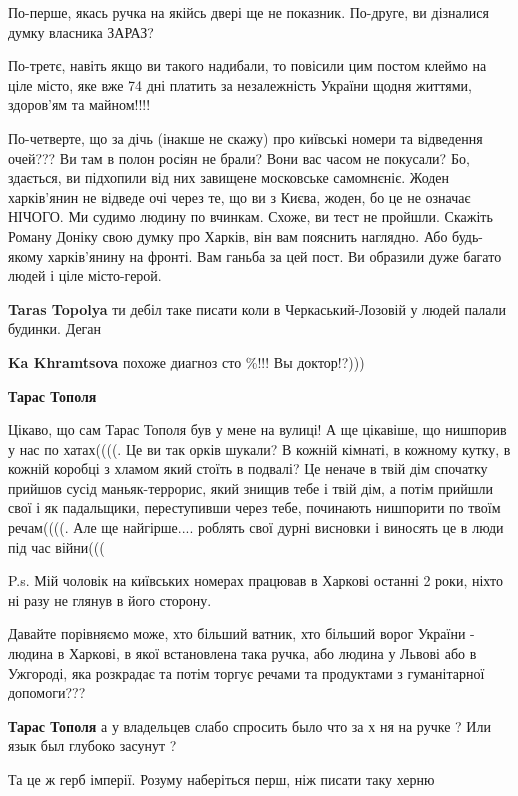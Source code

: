 \begin{itemize}
\begin{itemize}
По-перше, якась ручка на якійсь двері ще не показник. По-друге, ви дізналися
думку власника ЗАРАЗ? 

По-третє, навіть якщо ви такого надибали, то повісили цим постом клеймо на ціле
місто, яке вже 74 дні платить за незалежність України щодня життями, здоров'ям
та майном!!!! 

По-четверте, що за дічь (інакше не скажу) про київські номери та відведення
очей??? Ви там в полон росіян не брали? Вони вас часом не покусали? Бо,
здається, ви підхопили від них завищене московське самомнєніє. Жоден
харків'янин не відведе очі через те, що ви з Києва, жоден, бо це не означає
НІЧОГО. Ми судимо людину по вчинкам. Схоже, ви тест не пройшли. Скажіть Роману
Доніку свою думку про Харків, він вам пояснить наглядно. Або будь-якому
харків'янину на фронті. Вам ганьба за цей пост. Ви образили дуже багато людей і
ціле місто-герой.

\textbf{Taras Topolya} ти дебіл таке писати коли в Черкаський-Лозовій у людей палали будинки. Деган

\textbf{Ka Khramtsova} похоже диагноз сто \%!!! Вы доктор!?)))

\textbf{Тарас Тополя} 

Цікаво, що сам Тарас Тополя був у мене на вулиці! А ще цікавіше, що нишпорив у
нас по хатах((((. Це ви так орків шукали? В кожній кімнаті, в кожному кутку, в
кожній коробці з хламом який стоїть в подвалі? Це неначе в твій дім спочатку
прийшов сусід маньяк-террорис, який знищив тебе і твій дім, а потім прийшли
свої і як падальщики, переступивши через тебе, починають нишпорити по твоїм
речам((((. Але ще найгірше.... роблять свої дурні висновки і виносять це в люди
під час війни(((

P.s. Мій чоловік на київських номерах працював в Харкові останні 2 роки, ніхто
ні разу не глянув в його сторону.


Давайте порівняємо може, хто більший ватник, хто більший ворог України - людина
в Харкові, в якої встановлена така ручка, або людина у Львові або в Ужгороді,
яка розкрадає та потім торгує речами та продуктами з гуманітарної допомоги???

\textbf{Тарас Тополя} а у владельцев слабо спросить было что за х ня на ручке ? Или язык был глубоко засунут ?

Та це ж герб імперії. Розуму наберіться перш, ніж писати таку херню


\end{itemize}
\end{itemize}
